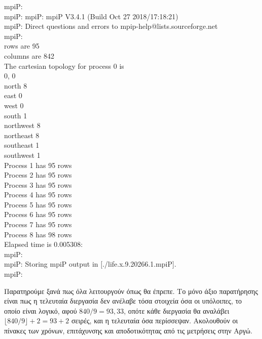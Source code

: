 \begin{tcolorbox}
mpiP: \\
mpiP: mpiP: mpiP V3.4.1 (Build Oct 27 2018/17:18:21) \\
mpiP: Direct questions and errors to mpip-help@lists.sourceforge.net \\
mpiP: \\
rows are 95 \\
columns are 842 \\

The cartesian topology for process 0 is \\
0, 0 \\
north 8 \\
east 0 \\
west 0 \\
south 1 \\
northwest 8 \\
northeast 8 \\
southeast 1 \\
southwest 1 \\

Process 1 has 95 rows \\
Process 2 has 95 rows \\
Process 3 has 95 rows \\
Process 4 has 95 rows \\
Process 5 has 95 rows \\
Process 6 has 95 rows \\
Process 7 has 95 rows \\
Process 8 has 98 rows \\
Elapsed time is 0.005308: \\
mpiP: \\
mpiP: Storing mpiP output in [./life.x.9.20266.1.mpiP]. \\
mpiP: \\
\end{tcolorbox}
Παρατηρούμε ξανά πως όλα λειτουργούν όπως θα έπρεπε. Το μόνο άξιο παρατήρησης είναι πως η τελευταία διεργασία δεν ανέλαβε τόσα στοιχεία όσα οι υπόλοιπες, το οποίο είναι λογικό, αφού $840 / 9 = 93,33$, οπότε κάθε διεργασία θα αναλάβει $\lfloor 840 / 9 \rfloor + 2 = 93 + 2$ σειρές, και η τελευταία όσα περίσσεψαν.
Ακολουθούν οι πίνακες των χρόνων, επιτάχυνσης και αποδοτικότητας από τις μετρήσεις στην Αργώ.

